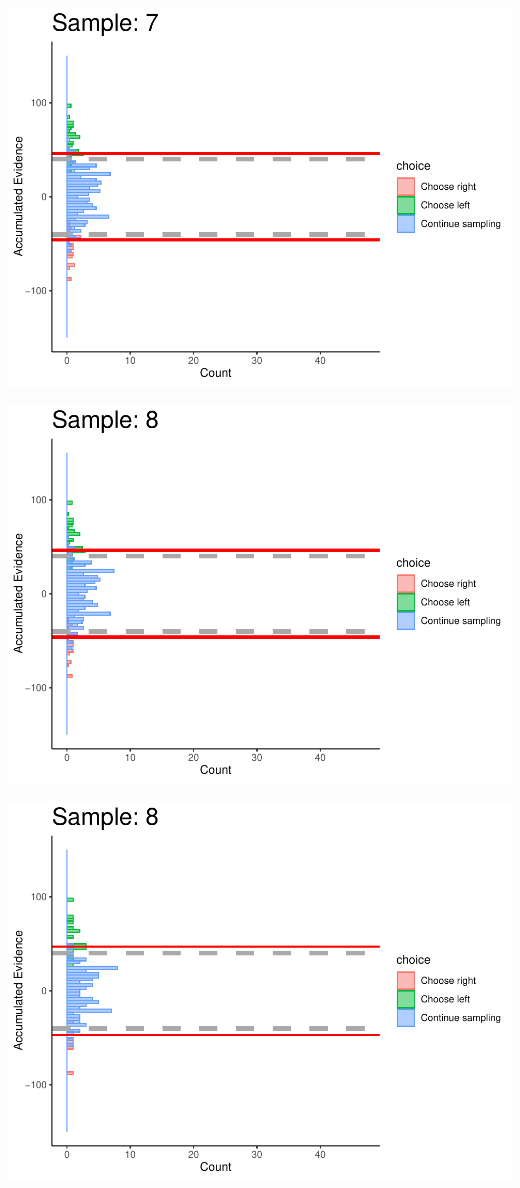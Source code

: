 \documentclass[
]{book}
\begin{document}
\begin{center}\includegraphics[width=0.8\linewidth]{LateNightBayes_files/figure-latex/collapsing_dcb-68} \end{center}

\begin{center}\includegraphics[width=0.8\linewidth]{LateNightBayes_files/figure-latex/collapsing_dcb-69} \end{center}

\begin{center}\includegraphics[width=0.8\linewidth]{LateNightBayes_files/figure-latex/collapsing_dcb-70} \end{center}
\end{document}

